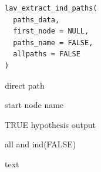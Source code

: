 \documentclass[a4paper]{book}
\begin{document}
%
\begin{Usage}
\begin{verbatim}
lav_extract_ind_paths(
  paths_data,
  first_node = NULL,
  paths_name = FALSE,
  allpaths = FALSE
)
\end{verbatim}
\end{Usage}
%
\begin{Arguments}
\begin{ldescription}
\item[\code{paths\_data}] direct path

\item[\code{first\_node}] start node name

\item[\code{paths\_name}] TRUE hypothesis output

\item[\code{allpaths}] all and ind(FALSE)
\end{ldescription}
\end{Arguments}
%
\begin{Value}
text
\end{Value}
%
\end{document}
